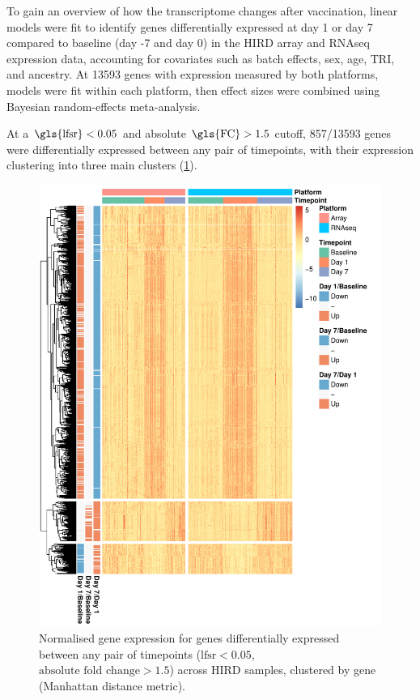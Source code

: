 To gain an overview of how the transcriptome changes after vaccination, linear models were fit to identify genes differentially expressed at day 1 or day 7 compared to baseline (day -7 and day 0) in the \gls{HIRD} array and \gls{RNAseq} expression data, accounting for covariates such as batch effects, sex, age, \gls{TRI}, and ancestry.
At 13593 genes with expression measured by both platforms, models were fit within each platform, then effect sizes were combined using Bayesian random-effects meta-analysis.

At a $\text{\gls{lfsr}} < 0.05$ and absolute $\text{\gls{FC}} > 1.5$ cutoff, 857/13593 genes were differentially expressed between any pair of timepoints, with their expression clustering into three main clusters (\cref{fig:hird_dge_heatmap}).
 
\begin{figure}
    \includegraphics[width=1.0\textwidth]{mainmatter/figures/chapter_02/plot_dge_eqtl.heatmap_dge.pdf}
    \caption{Normalised gene expression for genes differentially expressed between any pair of timepoints ($\text{lfsr} < 0.05$, $\text{absolute fold change} > 1.5$) across \gls{HIRD} samples, clustered by gene (Manhattan distance metric).}
    \label{fig:hird_dge_heatmap}
\end{figure}

